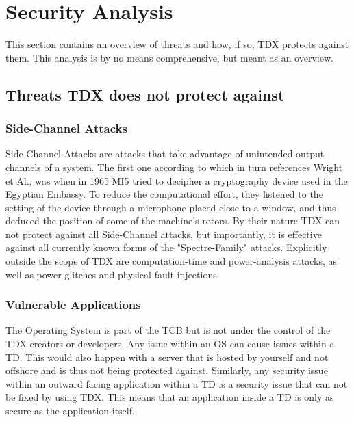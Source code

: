 
\chapter{Security Analysis}
\label{Security Analysis}

This section contains an overview of threats and how, if so, TDX protects against them. This analysis is by no means comprehensive, but meant as an overview.

\section{Threats TDX does not protect against}


\subsection{Side-Channel Attacks}

Side-Channel Attacks are attacks that take advantage of unintended output channels of a system. The first one according to \cite{zhou_side-channel_nodate} which in turn references Wright et Al., was when in 1965 MI5 tried to decipher a cryptography device used in the Egyptian Embassy. To reduce the computational effort, they listened to the setting of the device through a microphone placed close to a window, and thus deduced the position of some of the machine's rotors.
By their nature TDX can not protect against all Side-Channel attacks, but importantly, it is effective against all currently known forms of the "Spectre-Family" attacks. Explicitly outside the scope of TDX are computation-time and power-analysis attacks, as well as power-glitches and physical fault injections.

\subsection{Vulnerable Applications}

The Operating System is part of the \Gls{TCB} but is not under the control of the TDX creators or developers. Any issue within an OS can cause issues within a \Gls{TD}. This would also happen with a server that is hosted by yourself and not offshore and is thus not being protected against. Similarly, any security issue within an outward facing application within a \Gls{TD} is a security issue that can not be fixed by using TDX. This means that an application inside a TD is only as secure as the application itself. 

